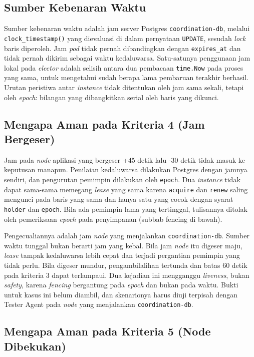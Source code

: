\subsection{Sumber Kebenaran Waktu}

Sumber kebenaran waktu adalah jam server Postgres \texttt{coordination-db}, melalui \texttt{clock\_timestamp()} yang dievaluasi di dalam pernyataan \texttt{UPDATE}, sesudah \textit{lock} baris diperoleh. Jam \textit{pod} tidak pernah dibandingkan dengan \texttt{expires\_at} dan tidak pernah dikirim sebagai waktu kedaluwarsa. Satu-satunya penggunaan jam lokal pada \textit{elector} adalah selisih antara dua pembacaan \texttt{time.Now} pada proses yang sama, untuk mengetahui sudah berapa lama pembaruan terakhir berhasil. Urutan peristiwa antar \textit{instance} tidak ditentukan oleh jam sama sekali, tetapi oleh \textit{epoch}: bilangan yang dibangkitkan serial oleh baris yang dikunci.

\subsection{Mengapa Aman pada Kriteria 4 (Jam Bergeser)}

Jam pada \textit{node} aplikasi yang bergeser +45 detik lalu -30 detik tidak masuk ke keputusan manapun. Penilaian kedaluwarsa dilakukan Postgres dengan jamnya sendiri, dan pengurutan pemimpin dilakukan oleh \texttt{epoch}. Dua \textit{instance} tidak dapat sama-sama memegang \textit{lease} yang sama karena \texttt{acquire} dan \texttt{renew} saling mengunci pada baris yang sama dan hanya satu yang cocok dengan syarat \texttt{holder} dan \texttt{epoch}. Bila ada pemimpin lama yang tertinggal, tulisannya ditolak oleh pemeriksaan \textit{epoch} pada penyimpanan (subbab fencing di bawah).

Pengecualiannya adalah jam \textit{node} yang menjalankan \texttt{coordination-db}. Sumber waktu tunggal bukan berarti jam yang kebal. Bila jam \textit{node} itu digeser maju, \textit{lease} tampak kedaluwarsa lebih cepat dan terjadi pergantian pemimpin yang tidak perlu. Bila digeser mundur, pengambilalihan tertunda dan batas 60 detik pada kriteria 3 dapat terlampaui. Dua kejadian ini mengganggu \textit{liveness}, bukan \textit{safety}, karena \textit{fencing} bergantung pada \textit{epoch} dan bukan pada waktu. Bukti untuk kasus ini belum diambil, dan skenarionya harus diuji terpisah dengan Tester Agent pada \textit{node} yang menjalankan \texttt{coordination-db}.

\subsection{Mengapa Aman pada Kriteria 5 (Node Dibekukan)}

